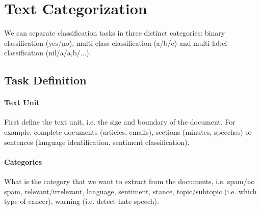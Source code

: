 \section{Text Categorization}

We can separate classification tasks in three distinct
categories: binary classification (yes/no), multi-class
classification (a/b/c) and multi-label
classification (nil/a/a,b/...).

\subsection{Task Definition}

\paragraph{Text Unit}

First define the text unit, i.e. the size and boundary
of the document. For example, complete documents (articles,
emails), sections (minutes, speeches) or sentences (language
identification, sentiment classification).

\paragraph{Categories}

What is the category that we want to extract from the documents,
i.e. spam/no spam, relevant/irrelevant, language, sentiment, stance,
topic/subtopic (i.e. which type of cancer), warning (i.e. detect hate
speech).


